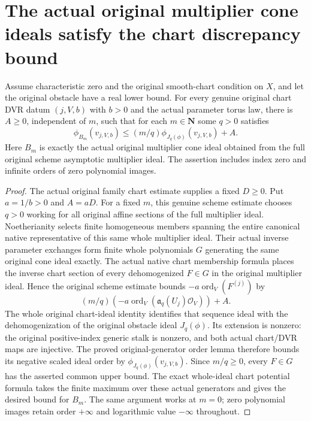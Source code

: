 \section{The actual original multiplier cone ideals satisfy the chart discrepancy bound}

\begin{theorem}
\label{thm:c0n-original-multiplier-chart-discrepancy}
\leanok
Assume characteristic zero and the original smooth-chart condition on
$X$, and let the original obstacle have a real lower bound.
For every genuine original chart DVR datum $(j,V,b)$ with $b>0$ and the
actual parameter torus law, there is $A\ge0$, independent of $m$, such that
for each $m\in\mathbf N$ some $q>0$ satisfies
\[
 \phi_{B_m}(v_{j,V,b})\le
 (m/q)\phi_{J_q(\phi)}(v_{j,V,b})+A.
\]
Here $B_m$ is exactly the actual original multiplier cone ideal obtained
from the full original scheme asymptotic multiplier ideal.  The assertion
includes index zero and infinite orders of zero polynomial images.
\end{theorem}
\begin{proof}
The actual original family chart estimate supplies a fixed $D\ge0$.
Put $a=1/b>0$ and $A=aD$.
For a fixed $m$, this genuine scheme estimate chooses $q>0$ working for
all original affine sections of the full multiplier ideal.
Noetherianity selects finite homogeneous members spanning the entire
canonical native representative of this same whole multiplier ideal.
Their actual inverse parameter exchanges form finite whole polynomials
$G$ generating the same original cone ideal exactly.
The actual native chart membership formula places the inverse chart
section of every dehomogenized $F\in G$ in the original multiplier ideal.
Hence the original scheme estimate bounds
$-a\operatorname{ord}_V(F^{(j)})$ by
\[
 (m/q)(-a\operatorname{ord}_V(\mathfrak a_q(U_j)\mathcal O_V))+A.
\]
The whole original chart-ideal identity identifies that sequence ideal
with the dehomogenization of the original obstacle ideal $J_q(\phi)$.
Its extension is nonzero: the original positive-index generic stalk is
nonzero, and both actual chart/DVR maps are injective.
The proved original-generator order lemma therefore bounds its negative
scaled ideal order by $\phi_{J_q(\phi)}(v_{j,V,b})$.
Since $m/q\ge0$, every $F\in G$ has the asserted common upper bound.
The exact whole-ideal chart potential formula takes the finite maximum
over these actual generators and gives the desired bound for $B_m$.
The same argument works at $m=0$; zero polynomial images retain order
$+\infty$ and logarithmic value $-\infty$ throughout.
\end{proof}
